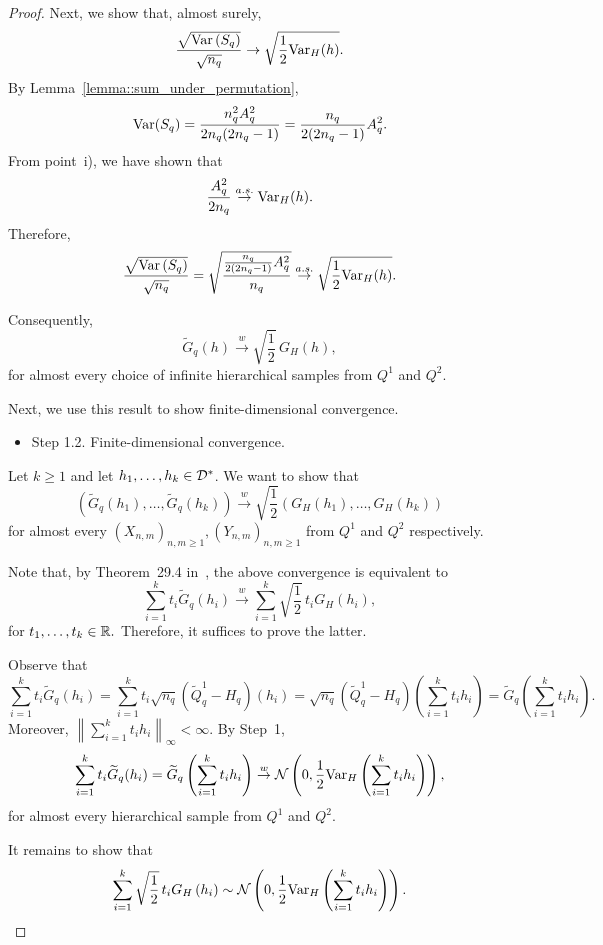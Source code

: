 \begin{proof}
Next, we show that, almost surely,
\[
\frac{\sqrt{\mathrm{Var}\left(S_q\right)}}{\sqrt{n_q}}
\to \sqrt{\frac{1}{2}\mathrm{Var}_H(h)}.
\]
By Lemma~\ref{lemma::sum_under_permutation},
\[
\mathrm{Var}(S_q)
= \frac{n_q^2 A_q^2}{2n_q(2n_q - 1)}
= \frac{n_q}{2(2n_q - 1)} A_q^2.
\]
From point~i), we have shown that
\[
\frac{A_q^2}{2n_q} \overset{a.s.}{\to} \mathrm{Var}_H(h).
\]
Therefore,
\[
\frac{\sqrt{\mathrm{Var}\left(S_q\right)}}{\sqrt{n_q}}
= \sqrt{\frac{\frac{n_q}{2(2n_q - 1)} A_q^2}{n_q}}
\overset{a.s.}{\to}
\sqrt{\frac{1}{2}\mathrm{Var}_H(h)}.
\]

Consequently,
\[
\widetilde{G}_q(h) \overset{w}{\to} \sqrt{\frac{1}{2}}\, G_H(h),
\]
for almost every choice of infinite hierarchical samples from $Q^1$ and $Q^2$.

Next, we use this result to show finite-dimensional convergence.

\begin{itemize}
    \item Step 1.2. Finite-dimensional convergence.
\end{itemize}

Let $k \geq 1$ and let $h_1,\dots,h_k \in \mathcal{D}^*$. We want to show that
\[
\left(\widetilde{G}_q\left(h_1\right),\dots, \widetilde{G}_q\left(h_k\right)\right)
\overset{w}{\to}
\sqrt{\frac{1}{2}}\left(G_H\left(h_1\right),\dots, G_H\left(h_k\right)\right)
\]
for almost every $(X_{n,m})_{n,m \geq 1}, (Y_{n,m})_{n,m \geq 1}$ from $Q^1$ and $Q^2$ respectively.

Note that, by Theorem~29.4 in~\cite{billingsley1995probability}, the above convergence is equivalent to
\[
\sum_{i = 1}^k t_i\widetilde{G}_q\left(h_i\right)
\overset{w}{\to}
\sum_{i = 1}^k \sqrt{\frac{1}{2}}\,t_i G_H\left(h_i\right),
\]
for $t_1,\dots,t_k \in \mathbb{R}.$ Therefore, it suffices to prove the latter.

Observe that
\[
\sum_{i = 1}^k t_i \widetilde{G}_q(h_i)
= \sum_{i = 1}^k t_i\sqrt{n_q}\left( \widetilde{Q}^1_q - H_q\right)\left(h_i\right)
= \sqrt{n_q}\left( \widetilde{Q}^1_q - H_q\right)\left(\sum_{i = 1}^k t_i h_i\right)
= \widetilde{G}_q\left(\sum_{i = 1}^k t_i h_i\right).
\]
Moreover, $\left\|\sum_{i = 1}^k t_i h_i\right\|_\infty < \infty$. By Step~1,
\[
\sum_{i = 1}^k t_i \widetilde{G}_q(h_i)
= \widetilde{G}_q\left(\sum_{i = 1}^k t_i h_i\right)
\overset{w}{\to}
\mathcal{N}\left(0, \frac{1}{2}\mathrm{Var}_H\left( \sum_{i = 1}^k t_i h_i\right) \right),
\]
for almost every hierarchical sample from $Q^1$ and $Q^2.$

It remains to show that
\[
\sum_{i = 1}^k \sqrt{\frac{1}{2}}\,t_i G_H\left(h_i\right)
\sim
\mathcal{N}\left(0, \frac{1}{2}\mathrm{Var}_H\left( \sum_{i = 1}^k t_i h_i\right) \right).
\]


\end{proof}
